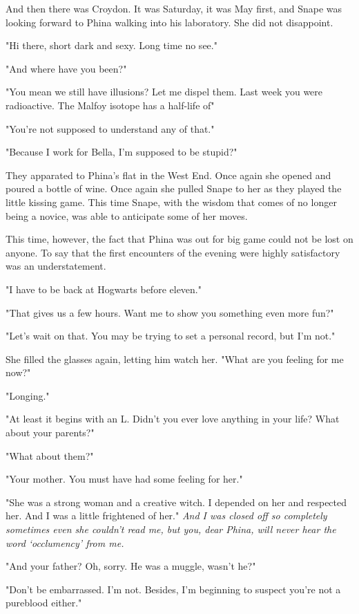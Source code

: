 And then there was Croydon. It was Saturday, it was May first, and Snape was looking forward to Phina walking into his laboratory. She did not disappoint.

"Hi there, short dark and sexy. Long time no see."

"And where have you been?"

"You mean we still have illusions? Let me dispel them. Last week you were radioactive. The Malfoy isotope has a half-life of{\el}"

"You're not supposed to understand any of that."

"Because I work for Bella, I'm supposed to be stupid?"

They apparated to Phina's flat in the West End. Once again she opened and poured a bottle of wine. Once again she pulled Snape to her as they played the little kissing game. This time Snape, with the wisdom that comes of no longer being a novice, was able to anticipate some of her moves.

This time, however, the fact that Phina was out for big game could not be lost on anyone. To say that the first encounters of the evening were highly satisfactory was an understatement.

"I have to be back at Hogwarts before eleven."

"That gives us a few hours. Want me to show you something even more fun?"

"Let's wait on that. You may be trying to set a personal record, but I'm not."

She filled the glasses again, letting him watch her. "What are you feeling for me now?"

"Longing."

"At least it begins with an L. Didn't you ever love anything in your life? What about your parents?"

"What about them?"

"Your mother. You must have had some feeling for her."

"She was a strong woman and a creative witch. I depended on her and respected her. And I was a little frightened of her." \emph{And I was closed off so completely sometimes even she couldn't read me, but you, dear Phina, will never hear the word `occlumency' from me.}

"And your father? Oh, sorry. He was a muggle, wasn't he?"

"Don't be embarrassed. I'm not. Besides, I'm beginning to suspect you're not a pureblood either."

